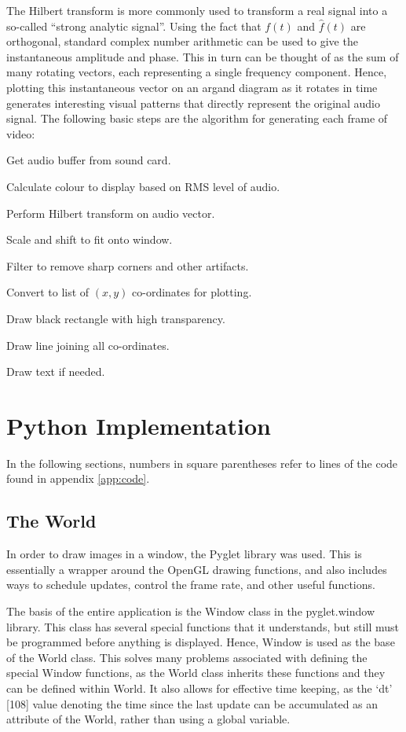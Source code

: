 \documentclass[11pt]{article}
\begin{document}
The Hilbert transform is more commonly used to transform a real signal into a so-called ``strong analytic signal''. Using the fact that $f(t)$ and $\hat{f}(t)$ are orthogonal, standard complex number arithmetic can be used to give the instantaneous amplitude and phase. This in turn can be thought of as the sum of many rotating vectors, each representing a single frequency component. Hence, plotting this instantaneous vector on an argand diagram as it rotates in time generates interesting visual patterns that directly represent the original audio signal.
\newpage The following basic steps are the algorithm for generating each frame of video:
\begin{enumerate*}
	\item Get audio buffer from sound card.
	\item Calculate colour to display based on RMS level of audio.
	\item Perform Hilbert transform on audio vector.
	\item Scale and shift to fit onto window.
	\item Filter to remove sharp corners and other artifacts.
	\item Convert to list of $(x,y)$ co-ordinates for plotting.
	\item Draw black rectangle with high transparency.
	\item Draw line joining all co-ordinates.
	\item Draw text if needed.
\end{enumerate*}

\section{Python Implementation}
In the following sections, numbers in square parentheses refer to lines of the code found in appendix \ref{app:code}. 

\subsection{The World}
In order to draw images in a window, the Pyglet library was used\cite{pyglet}. This is essentially a wrapper around the OpenGL drawing functions\cite{opengl}, and also includes ways to schedule updates, control the frame rate, and other useful functions.

The basis of the entire application is the Window class in the pyglet.window library. This class has several special functions that it understands, but still must be programmed before anything is displayed. Hence, Window is used as the base of the World class. This solves many problems associated with defining the special Window functions, as the World class inherits these functions and they can be defined within World. It also allows for effective time keeping, as the `dt' [108] value denoting the time since the last update can be accumulated as an attribute of the World, rather than using a global variable.
\end{document}
